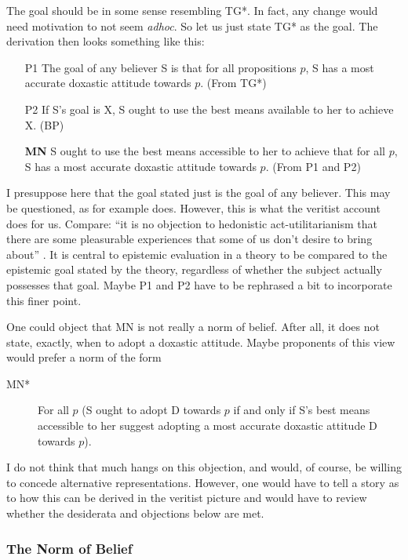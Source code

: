 \documentclass[12pt,numbers=noenddot]{scrartcl}
\begin{document}
The goal should be in some sense resembling TG*. In fact, any change would need motivation to not seem \emph{adhoc}. So let us just state TG* as the goal. The derivation then looks something like this:

\begin{enumerate}
    \item[P1] The goal of any believer S is that for all propositions $p$, S has a most accurate doxastic attitude towards $p$. (From TG*)
    \item[P2] If S's goal is X, S ought to use the best means available to her to achieve X. (BP)
    \item[\textbf{MN}] S ought to use the best means accessible to her to achieve that for all $p$, S has a most accurate doxastic attitude towards $p$. (From P1 and P2)
\end{enumerate}

I presuppose here that the goal stated just is the goal of any believer. This may be questioned, as for example \textcite{Kelly2003-KELERA} does. However, this is what the veritist account does for us. Compare: “it is no objection to hedonistic act-utilitarianism that there are some pleasurable experiences that some of us don’t desire to bring about” \autocite[362]{Berker2013-BERETA-2}. It is central to epistemic evaluation in a theory to be compared to the epistemic goal stated by the theory, regardless of whether the subject actually possesses that goal. Maybe P1 and P2 have to be rephrased a bit to incorporate this finer point.

One could object that MN is not really a norm of belief. After all, it does not state, exactly, when to adopt a doxastic attitude. Maybe proponents of this view would prefer a norm of the form
\begin{description}
    \item[MN*] For all $p$ (S ought to adopt D towards $p$ if and only if S's best means accessible to her suggest adopting a most accurate doxastic attitude D towards $p$).
\end{description}
I do not think that much hangs on this objection, and would, of course, be willing to concede alternative representations. However, one would have to tell a story as to how this can be derived in the veritist picture and would have to review whether the desiderata and objections below are met.

\subsubsection{The Norm of Belief}
\end{document}
